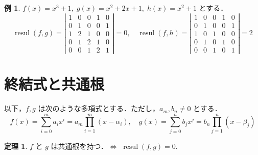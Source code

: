 \documentclass[12pt, uplatex, dvipdfmx]{jsarticle}
\theoremstyle{definition}
\newtheorem{theorem}{定理}
\newtheorem{example}{例}
\DeclareMathOperator{\resul}{resul}
\begin{document}
\begin{example}\label{exmp:fgh}
  $f(x) = x^3+1, \; g(x)=x^2+2x+1, \; h(x) = x^2+1$ とする．
  \[
    \resul(f,g) = \left| 
      \begin{array}{ccccc}
        1 & 0 & 0 & 1 & 0\\
        0 & 1 & 0 & 0 & 1\\
        1 & 2 & 1 & 0 & 0\\
        0 & 1 & 2 & 1 & 0\\
        0 & 0 & 1 & 2 & 1
      \end{array}
    \right|=0, \quad \resul(f,h) = \left|
      \begin{array}{ccccc}
        1 & 0 & 0 & 1 & 0\\
        0 & 1 & 0 & 0 & 1\\
        1 & 0 & 1 & 0 & 0\\
        0 & 1 & 0 & 1 & 0\\
        0 & 0 & 1 & 0 & 1
      \end{array}
    \right|=2
  \]
\end{example}

\section{終結式と共通根}

以下，$f,g$ は次のような多項式とする．ただし，$a_m, b_n \neq 0$ とする．
\[
  f(x)=\sum_{i=0}^{m} a_i x^i = a_m\prod_{i=1}^{m}(x-\alpha_i), \quad
  g(x)=\sum_{j=0}^{n} b_j x^j=b_n\prod_{j=1}^{n}(x-\beta_j)
\]

\begin{theorem}\label{thm:common-solution}
$f$ と $g$ は共通根を持つ．$\Longleftrightarrow$ \;$\resul(f,g)=0$.
\end{theorem}
\end{document}

